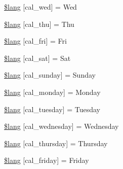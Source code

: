 \begin{DoxyCompactItemize}
\item 
\hyperlink{system_2language_2english_2calendar__lang_8php_a94d7b85acb850c5930399c9099b22412}{\$lang} \mbox{[}\textquotesingle{}cal\+\_\+wed\textquotesingle{}\mbox{]} = \textquotesingle{}Wed\textquotesingle{}
\item 
\hyperlink{system_2language_2english_2calendar__lang_8php_af49921f5f0bcc54c07efed2cf4b71e01}{\$lang} \mbox{[}\textquotesingle{}cal\+\_\+thu\textquotesingle{}\mbox{]} = \textquotesingle{}Thu\textquotesingle{}
\item 
\hyperlink{system_2language_2english_2calendar__lang_8php_abfe2cd9d203b296392f657caf8488b53}{\$lang} \mbox{[}\textquotesingle{}cal\+\_\+fri\textquotesingle{}\mbox{]} = \textquotesingle{}Fri\textquotesingle{}
\item 
\hyperlink{system_2language_2english_2calendar__lang_8php_aa1dc0204b4066fa35b0760e1437e8194}{\$lang} \mbox{[}\textquotesingle{}cal\+\_\+sat\textquotesingle{}\mbox{]} = \textquotesingle{}Sat\textquotesingle{}
\item 
\hyperlink{system_2language_2english_2calendar__lang_8php_ade346ced9dfd91f19b1912bda55ed6b9}{\$lang} \mbox{[}\textquotesingle{}cal\+\_\+sunday\textquotesingle{}\mbox{]} = \textquotesingle{}Sunday\textquotesingle{}
\item 
\hyperlink{system_2language_2english_2calendar__lang_8php_a55fb324dcfcabd69cc212d116b6b0254}{\$lang} \mbox{[}\textquotesingle{}cal\+\_\+monday\textquotesingle{}\mbox{]} = \textquotesingle{}Monday\textquotesingle{}
\item 
\hyperlink{system_2language_2english_2calendar__lang_8php_a2f395fc42eea1e44a77e77525b266061}{\$lang} \mbox{[}\textquotesingle{}cal\+\_\+tuesday\textquotesingle{}\mbox{]} = \textquotesingle{}Tuesday\textquotesingle{}
\item 
\hyperlink{system_2language_2english_2calendar__lang_8php_a85c82aef005144770cf7356945a85819}{\$lang} \mbox{[}\textquotesingle{}cal\+\_\+wednesday\textquotesingle{}\mbox{]} = \textquotesingle{}Wednesday\textquotesingle{}
\item 
\hyperlink{system_2language_2english_2calendar__lang_8php_a3ab3ea291fddc8063b57a25cfbc7cf0f}{\$lang} \mbox{[}\textquotesingle{}cal\+\_\+thursday\textquotesingle{}\mbox{]} = \textquotesingle{}Thursday\textquotesingle{}
\item 
\hyperlink{system_2language_2english_2calendar__lang_8php_a5be751a9260fe00120263d6e1f41de8c}{\$lang} \mbox{[}\textquotesingle{}cal\+\_\+friday\textquotesingle{}\mbox{]} = \textquotesingle{}Friday\textquotesingle{}
\item 

\end{DoxyCompactItemize}
